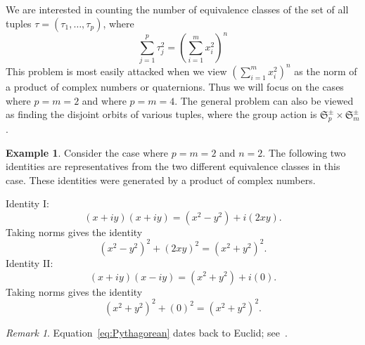 \documentclass[12pt,table]{article}
\theoremstyle{definition}
\newtheorem{example}[theorem]{Example}
\theoremstyle{remark}
\newtheorem{remark}[theorem]{Remark}
\newcommand{\Zzz}{\mathbb Z}
\numberwithin{equation}{section}
\begin{document}
We are interested in counting the number of
equivalence classes of the set of all tuples
 $ \tau = ( \tau_1, \dotsc, \tau_p) $,
where
\begin{equation}
\label{equation_general}
\sum_{j = 1}^{p}  \tau_j ^ 2  
= 
\left( \sum_{i = 1}^{m}  x_i ^ 2  \right) ^ n 
\end{equation}
This problem is most easily attacked when we
view $ \left( \sum_{i = 1}^{m}  x_i ^ 2  \right) ^ n $
as the norm of a product of complex numbers or quaternions.
Thus we will focus on the cases where $ p = m = 2 $ and where $ p = m = 4 $.
The general problem can also be viewed as finding the disjoint orbits of 
various tuples, where the group action is $ \mathfrak{S}_p^\pm \times \mathfrak{S}_m^\pm $.



\begin{example}

Consider the case where $ p = m = 2 $ and $ n = 2$.
The following two identities are representatives from 
the two different equivalence classes in this case. These identities
were generated by a product of complex numbers. 

\noindent
Identity I:
\begin{equation*}
(x + iy)(x + iy) = (x^2 - y^2 ) + i(2xy).
\end{equation*}
Taking norms gives the identity
\begin{equation}
\label{eq:Pythagorean}
    (x^2 - y^2 )^2 + (2xy)^2 
    = (x^2 + y^2)^2.
\end{equation}
Identity II:
\begin{equation*}
    (x + iy )(x - iy )
    = (x^2 + y^2 ) + i(0).
\end{equation*}
Taking norms gives the identity
\begin{equation}
    (x^2 + y^2 )^2 + (0)^2
    = (x^2 + y^2 )^2.
\end{equation}
\end{example}

\begin{remark}
Equation~\eqref{eq:Pythagorean} dates back to Euclid; see~\cite{Euclid}. 
\end{remark}
\end{document}

